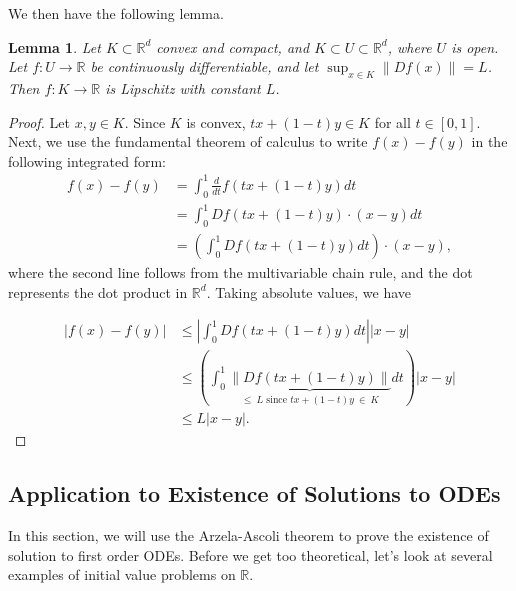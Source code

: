 \documentclass[12pt]{amsart}         %
\newtheorem{lemma}{Lemma}[section]
\theoremstyle{remark}
\newcommand{\R}{\mathbb{R}}
\begin{document}
We then have the following lemma.

\begin{lemma}
Let $K \subset \R^d$ convex and compact, and $K \subset U \subset \R^d$, where $U$ is open. Let $f: U \rightarrow \R$ be continuously differentiable, and let $\sup_{x \in K} \|Df(x)\| = L$. Then $f: K \rightarrow \R$ is Lipschitz with constant $L$.
\end{lemma}

\begin{proof}
Let $x,y \in K$. Since $K$ is convex, $tx + (1 - t)y \in K$ for all 
$t \in [0,1]$. Next, we use the fundamental theorem of calculus to write $f(x)- f(y)$ in the following integrated form:
\begin{align*}
f(x)- f(y) &= \int_0^1 \frac{d}{dt} f\left(tx + (1-t)y\right) dt \\
&= \int_0^1 Df(tx + (1-t)y) \cdot (x-y) dt \\
&= \left( \int_0^1 Df(tx + (1-t)y) dt \right) \cdot (x-y),
\end{align*}
where the second line follows from the multivariable chain rule, and the dot represents the dot product in $\R^d$. Taking absolute values, we have

\begin{align*}        
|f(x)- f(y)| &\leq \left| \int_0^1 Df(tx + (1-t)y) dt \right| |x-y| \\
&\leq \left( \int_0^1 \underbrace{ \| Df(tx + (1-t)y) \| }_{\leq\:L \text{ since } tx + (1 - t)y\:\in\:K } dt \right) |x-y| \\
&\leq L |x-y|.
\end{align*}
    
\end{proof}

\subsection{Application to Existence of Solutions to ODEs}

In this section, we will use the Arzela-Ascoli theorem to prove the existence of solution to first order ODEs. Before we get too theoretical, let's look at several examples of initial value problems on $\R$.
\end{document}
